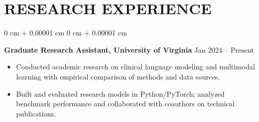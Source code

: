 \documentclass[10pt, letterpaper]{article}
\newenvironment{highlights}{
    \begin{itemize}[
        topsep=0.03 cm,
        parsep=0.03 cm,
        partopsep=0pt,
        itemsep=0pt,
        leftmargin=0 cm + 10pt
    ]
}{
    \end{itemize}
} %
\newenvironment{onecolentry}{
    \begin{adjustwidth}{
        0 cm + 0.00001 cm
    }{
        0 cm + 0.00001 cm
    }
}{
    \end{adjustwidth}
} %
\begin{document}
\section{RESEARCH EXPERIENCE}
\begin{onecolentry}
\textbf{Graduate Research Assistant, University of Virginia} \hfill Jan 2024 -- Present
\begin{highlights}
\item Conducted academic research on clinical language modeling and multimodal learning with empirical comparison of methods and data sources.
\item Built and evaluated research models in Python/PyTorch; analyzed benchmark performance and collaborated with coauthors on technical publications.
\end{highlights}
\end{onecolentry}
\end{document}
